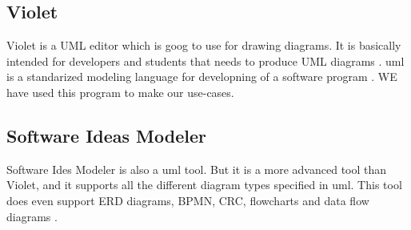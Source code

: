 \subsection{Violet}
Violet is a UML editor which is goog to use for drawing diagrams. It is basically intended for developers and students that needs to produce UML diagrams \cite{bib:violet}. \gls{uml} is a standarized modeling language for developning of a software program \cite{bib:lmu}. WE have used this program to make our use-cases.

\subsection{Software Ideas Modeler}
Software Ides Modeler is also a \gls{uml} tool. But it is a more advanced tool than Violet, and it supports all the different diagram types specified in \gls{uml}. This tool does even support ERD diagrams, BPMN, CRC, flowcharts and data flow diagrams \cite{bib:sim}.